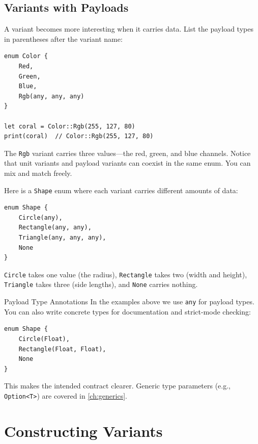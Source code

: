 \subsection{Variants with Payloads}

A variant becomes more interesting when it carries data. List the payload
types in parentheses after the variant name:

\begin{lstlisting}[language=Lattice, caption={Enum with payload variants}]
enum Color {
    Red,
    Green,
    Blue,
    Rgb(any, any, any)
}

let coral = Color::Rgb(255, 127, 80)
print(coral)  // Color::Rgb(255, 127, 80)
\end{lstlisting}

The \lstinline|Rgb| variant carries three values---the red, green, and blue
channels. Notice that unit variants and payload variants can coexist in the
same enum. You can mix and match freely.

Here is a \lstinline|Shape| enum where each variant carries different amounts
of data:

\begin{lstlisting}[language=Lattice, caption={Variants with different payload sizes}]
enum Shape {
    Circle(any),
    Rectangle(any, any),
    Triangle(any, any, any),
    None
}
\end{lstlisting}

\lstinline|Circle| takes one value (the radius), \lstinline|Rectangle| takes
two (width and height), \lstinline|Triangle| takes three (side lengths),
and \lstinline|None| carries nothing.

\begin{notebox}{Payload Type Annotations}
In the examples above we use \lstinline|any| for payload types. You can also
write concrete types for documentation and strict-mode checking:

\begin{lstlisting}[language=Lattice]
enum Shape {
    Circle(Float),
    Rectangle(Float, Float),
    None
}
\end{lstlisting}

This makes the intended contract clearer. Generic type parameters (e.g.,
\lstinline|Option<T>|) are covered in \cref{ch:generics}.
\end{notebox}

\section{Constructing Variants}\label{sec:enum-construction}

